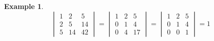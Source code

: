 \documentclass[a4paper]{article}
\newcounter{lecref}[section]
\numberwithin{lecref}{section}
\newtheorem{example}[lecref]{Example}
\begin{document}
\begin{example} %
  \[
    \begin{vmatrix}
      1 & 2 & 5 \\
      2 & 5 & 14 \\
      5 & 14 & 42
    \end{vmatrix}
    =
    \begin{vmatrix}
      1 & 2 & 5 \\
      0 & 1 & 4 \\
      0 & 4 & 17
    \end{vmatrix}
    =
    \begin{vmatrix}
      1 & 2 & 5 \\
      0 & 1 & 4 \\
      0 & 0 & 1
    \end{vmatrix}
    = 1
  \]
\end{example}
\end{document}
